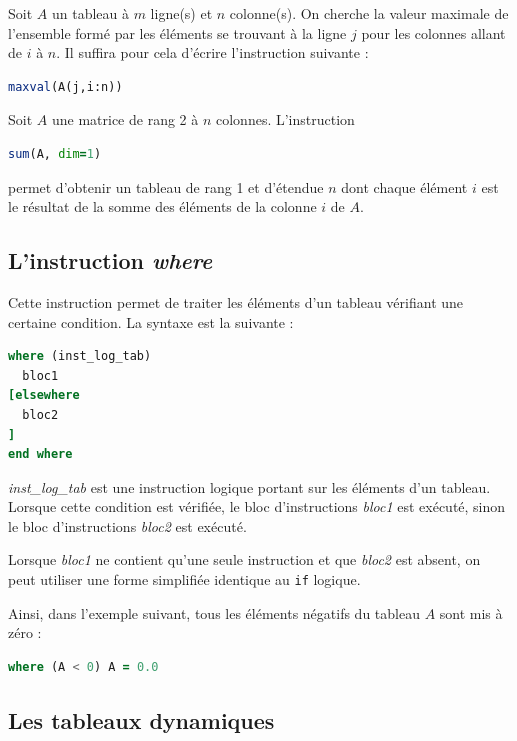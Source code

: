 \documentclass[a4paper,twoside]{article}
\begin{document}
\begin{exemple}
Soit $A$ un tableau à $m$ ligne(s) et $n$ colonne(s). On cherche la valeur maximale de l'ensemble formé par les éléments se trouvant à la ligne $j$ pour les colonnes allant de $i$ à $n$. Il suffira pour cela d'écrire l'instruction suivante :
\begin{lstlisting}[language=Fortran]
maxval(A(j,i:n))
\end{lstlisting}

\bigskip

Soit $A$ une matrice de rang 2 à $n$ colonnes. L'instruction 
\begin{lstlisting}[language=Fortran]
sum(A, dim=1)
\end{lstlisting}
permet d'obtenir un tableau de rang 1 et d'étendue $n$ dont chaque élément $i$ est le résultat de la somme des éléments de la colonne $i$ de $A$.
\end{exemple}


\subsection{L'instruction \emph{where}}

Cette instruction permet de traiter les éléments d'un tableau vérifiant une certaine condition. La syntaxe est la suivante :

\begin{lstlisting}[language=Fortran]
where (inst_log_tab)
  bloc1 
[elsewhere 
  bloc2 
] 
end where
\end{lstlisting}
\emph{inst\_log\_tab} est une instruction logique portant sur les éléments d'un tableau. Lorsque cette condition est vérifiée, le bloc d'instructions \emph{bloc1} est exécuté, sinon le bloc d'instructions \emph{bloc2} est exécuté. 

Lorsque \emph{bloc1} ne contient qu'une seule instruction et que \emph{bloc2} est absent, on peut utiliser une forme simplifiée identique au \texttt{if} logique. 

Ainsi, dans l'exemple suivant, tous les éléments négatifs du tableau $A$ sont mis à zéro : 
\begin{lstlisting}[language=Fortran]
where (A < 0) A = 0.0
\end{lstlisting}

\subsection{Les tableaux dynamiques}
\end{document}
